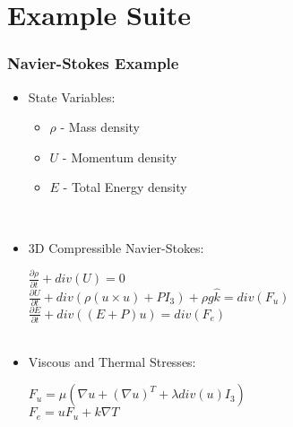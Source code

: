 \documentclass{beamer}
\begin{document}
\section{Example Suite}

\begin{frame}
\begin{center}
\frametitle{Navier-Stokes Example}

\begin{itemize}

\item State Variables:

\begin{itemize}

\item $\rho$ - Mass density

\item $U$ - Momentum density

\item $E$ - Total Energy density\\

\end{itemize}

~\\

\item 3D Compressible Navier-Stokes:

\hspace{32mm} $\frac{\partial \rho}{\partial t} + div \left( U \right) = 0$\\
$\frac{\partial U}{\partial t} + div \left( \rho \left( u \times u \right) + P I_3 \right) + \rho g \hat{k} = div \left( F_u \right)$\\
\hspace{19mm} $\frac{\partial E}{\partial t} + div \left( \left(E + P \right) u \right) = div \left( F_e \right)$\\

~\\

\item Viscous and Thermal Stresses:

$F_u = \mu \left( \nabla u + \left( \nabla u \right)^T + \lambda div \left( u \right) I_3 \right)$\\
$F_e = u F_u + k \nabla T$

\end{itemize}

\end{center}
\end{frame}
\end{document}
